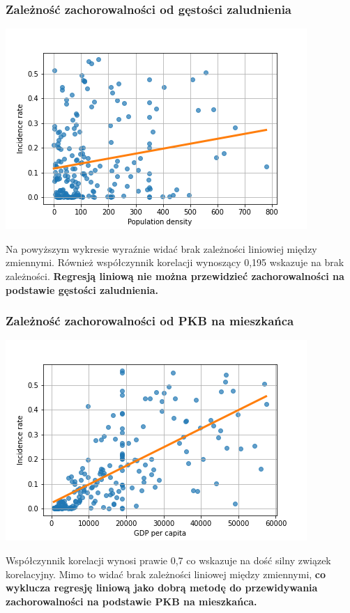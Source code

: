 \documentclass[10pt]{article}
\begin{document}
\subsubsection{Zależność zachorowalności od gęstości zaludnienia}
\begin{center}
\includegraphics[width=0.8\linewidth]{incidence_density.png}
\end{center}
Na powyższym wykresie wyraźnie widać brak zależności liniowiej między zmiennymi. 
Również współczynnik korelacji wynoszący 0,195 wskazuje na brak zależności.
\textbf{Regresją liniową nie można przewidzieć zachorowalności na podstawie gęstości zaludnienia.}
\subsubsection{Zależność zachorowalności od PKB na mieszkańca}
\begin{center}
\includegraphics[width=0.8\linewidth]{gdp_incidence.png}
\end{center}
Współczynnik korelacji wynosi prawie 0,7 co wskazuje na dość silny związek korelacyjny. 
Mimo to widać brak zależności liniowej między zmiennymi, \textbf{co wyklucza regresję liniową jako dobrą metodę do przewidywania zachorowalności na podstawie PKB na mieszkańca.}
\newpage
\end{document}
